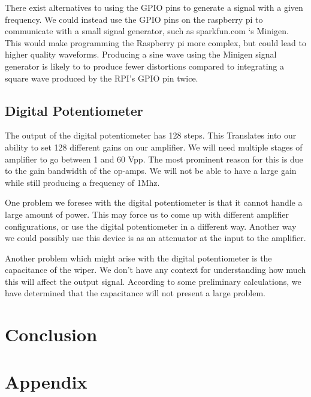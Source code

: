 \documentclass{article}	%
\begin{document}
\begin{multicols}{2}
There exist alternatives to using the GPIO pins to generate a signal with a given frequency. We could instead use the GPIO pins on the raspberry pi to communicate with a small signal generator, such as sparkfun.com ‘s Minigen. This would make programming the Raspberry pi more complex, but could lead to higher quality waveforms. Producing a sine wave using the Minigen signal generator is likely to to produce fewer distortions compared to integrating a square wave produced by the RPI’s GPIO pin twice. 

\subsection{Digital Potentiometer}
The output of the digital potentiometer has 128 steps. This Translates into our ability to set 128 different gains on our amplifier. We will need multiple stages of amplifier to go between 1 and 60 Vpp. The most prominent reason for this is due to the gain bandwidth of the op-amps. We will not be able to have a large gain while still producing a frequency of 1Mhz.

One problem we foresee with the digital potentiometer is that it cannot handle a large amount of power. This may force us to come up with different amplifier configurations, or use the digital potentiometer in a different way. Another way we could possibly use this device is as an attenuator at the input to the amplifier.

Another problem which might arise with the digital potentiometer is the capacitance of the wiper. We don’t have any context for understanding how much this will affect the output signal. According to some preliminary calculations, we have determined that the capacitance will not present a large problem.

\section{Conclusion}

\end{multicols}

\section{Appendix}
\end{document}
